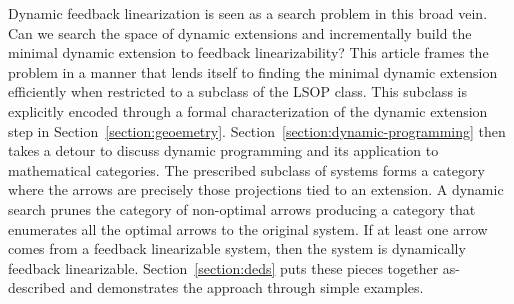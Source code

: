 \documentclass[a4paper]{ifacconf}
\begin{document}
Dynamic feedback linearization is seen as a search problem in this broad vein.
Can we search the space of dynamic extensions and incrementally build the minimal dynamic extension to feedback linearizability?
This article frames the problem in a manner that lends itself to finding the minimal dynamic extension efficiently when restricted to a subclass of the LSOP class.
This subclass is explicitly encoded through a formal characterization of the dynamic extension step in Section~\ref{section:geoemetry}.
Section~\ref{section:dynamic-programming} then takes a detour to discuss dynamic programming and its application to mathematical categories.
The prescribed subclass of systems forms a category where the arrows are precisely those projections tied to an extension.
A dynamic search prunes the category of non-optimal arrows producing a category that enumerates all the optimal arrows to the original system.
If at least one arrow comes from a feedback linearizable system, then the system is dynamically feedback linearizable.
Section~\ref{section:deds} puts these pieces together as-described and demonstrates the approach through simple examples.
\end{document}
